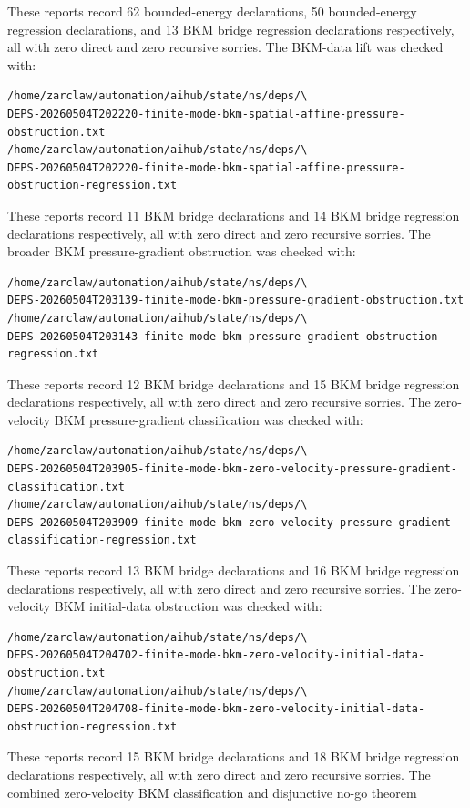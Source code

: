 \documentclass[11pt]{article}
\begin{document}
These reports record 62 bounded-energy declarations, 50 bounded-energy
regression declarations, and 13 BKM bridge regression declarations respectively,
all with zero direct and zero recursive sorries.
The BKM-data lift was checked with:
\begin{verbatim}
/home/zarclaw/automation/aihub/state/ns/deps/\
DEPS-20260504T202220-finite-mode-bkm-spatial-affine-pressure-obstruction.txt
/home/zarclaw/automation/aihub/state/ns/deps/\
DEPS-20260504T202220-finite-mode-bkm-spatial-affine-pressure-obstruction-regression.txt
\end{verbatim}
These reports record 11 BKM bridge declarations and 14 BKM bridge regression
declarations respectively, all with zero direct and zero recursive sorries.
The broader BKM pressure-gradient obstruction was checked with:
\begin{verbatim}
/home/zarclaw/automation/aihub/state/ns/deps/\
DEPS-20260504T203139-finite-mode-bkm-pressure-gradient-obstruction.txt
/home/zarclaw/automation/aihub/state/ns/deps/\
DEPS-20260504T203143-finite-mode-bkm-pressure-gradient-obstruction-regression.txt
\end{verbatim}
These reports record 12 BKM bridge declarations and 15 BKM bridge regression
declarations respectively, all with zero direct and zero recursive sorries.
The zero-velocity BKM pressure-gradient classification was checked with:
\begin{verbatim}
/home/zarclaw/automation/aihub/state/ns/deps/\
DEPS-20260504T203905-finite-mode-bkm-zero-velocity-pressure-gradient-classification.txt
/home/zarclaw/automation/aihub/state/ns/deps/\
DEPS-20260504T203909-finite-mode-bkm-zero-velocity-pressure-gradient-classification-regression.txt
\end{verbatim}
These reports record 13 BKM bridge declarations and 16 BKM bridge regression
declarations respectively, all with zero direct and zero recursive sorries.
The zero-velocity BKM initial-data obstruction was checked with:
\begin{verbatim}
/home/zarclaw/automation/aihub/state/ns/deps/\
DEPS-20260504T204702-finite-mode-bkm-zero-velocity-initial-data-obstruction.txt
/home/zarclaw/automation/aihub/state/ns/deps/\
DEPS-20260504T204708-finite-mode-bkm-zero-velocity-initial-data-obstruction-regression.txt
\end{verbatim}
These reports record 15 BKM bridge declarations and 18 BKM bridge regression
declarations respectively, all with zero direct and zero recursive sorries.
The combined zero-velocity BKM classification and disjunctive no-go theorem
\end{document}
